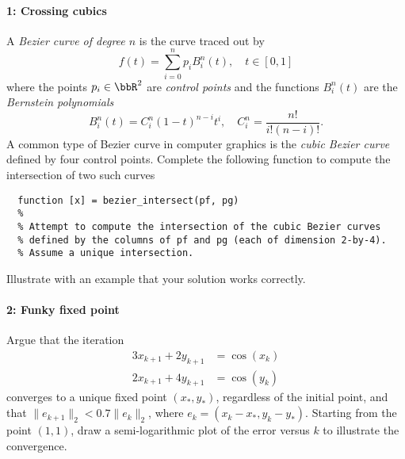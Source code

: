 \documentclass[12pt, leqno]{article}
\begin{document}

\paragraph*{1: Crossing cubics}
A {\em Bezier curve of degree $n$} is the curve traced out by
\[
  f(t) = \sum_{i=0}^n p_i B_i^n(t), \quad t \in [0,1]
\]
where the points $p_i \in \bbR^2$ are {\em control points} and
the functions $B_i^n(t)$ are the {\em Bernstein polynomials}
\[
  B_i^n(t) = C^n_i (1-t)^{n-i} t^i, \quad C^n_i = \frac{n!}{i!(n-i)!}.
\]
A common type of Bezier curve in computer graphics is the {\em cubic
  Bezier curve} defined by four control points.  Complete the
following function to compute the intersection of two such curves
\begin{lstlisting}
  function [x] = bezier_intersect(pf, pg)
  %
  % Attempt to compute the intersection of the cubic Bezier curves
  % defined by the columns of pf and pg (each of dimension 2-by-4).
  % Assume a unique intersection.
\end{lstlisting}
Illustrate with an example that your solution works correctly.

\paragraph*{2: Funky fixed point}
Argue that the iteration
\begin{align*}
  3x_{k+1} + 2y_{k+1} &= \cos(x_k) \\
  2x_{k+1} + 4y_{k+1} &= \cos(y_k)
\end{align*}
converges to a unique fixed point $(x_*, y_*)$, regardless of
the initial point, and that $\|e_{k+1}\|_2 < 0.7 \|e_k\|_2$, where
$e_k = (x_k-x_*, y_k-y_*)$.  Starting from the point $(1,1)$,
draw a semi-logarithmic plot of the error versus $k$ to illustrate
the convergence.
\end{document}
